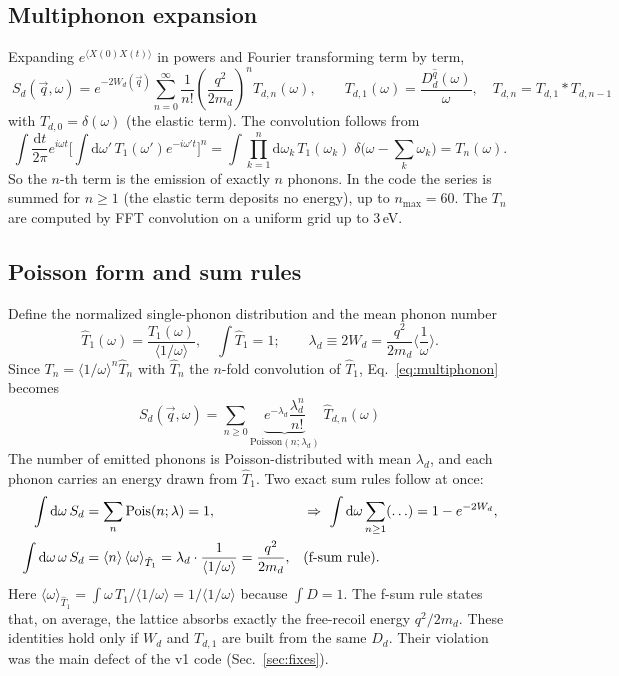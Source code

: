 \documentclass[11pt,a4paper]{article}
\numberwithin{equation}{section}
\newcommand{\qv}{\vec q}
\newcommand{\qh}{\hat q}
\newcommand{\dd}{\mathrm{d}}
\newcommand{\avg}[1]{\langle #1\rangle}
\begin{document}
\subsection{Multiphonon expansion}
Expanding $e^{\avg{X(0)X(t)}}$ in powers and Fourier transforming term by term,
\begin{equation}
  \boxed{\;S_d(\qv,\omega) = e^{-2W_d(\qv)}\sum_{n=0}^{\infty}\frac{1}{n!}
  \left(\frac{q^2}{2m_d}\right)^{\!n} T_{d,n}(\omega),\qquad
  T_{d,1}(\omega)=\frac{D_d^{\qh}(\omega)}{\omega},\quad
  T_{d,n}=T_{d,1}*T_{d,n-1}\;}
  \label{eq:multiphonon}
\end{equation}
with $T_{d,0}=\delta(\omega)$ (the elastic term). The convolution follows from
\begin{equation}
  \int\frac{\dd t}{2\pi}e^{i\omega t}\Big[\int\dd\omega'\,T_1(\omega')e^{-i\omega't}\Big]^n
  = \int\prod_{k=1}^n\dd\omega_k\,T_1(\omega_k)\;\delta\!\Big(\omega-\sum_k\omega_k\Big)
  = T_n(\omega).
\end{equation}
So the $n$-th term is the emission of exactly $n$ phonons. In the code the series is summed
for $n\ge1$ (the elastic term deposits no energy), up to $n_{\max}=60$. The $T_n$ are
computed by FFT convolution on a uniform grid up to 3\,eV.

\subsection{Poisson form and sum rules}
\label{sec:poisson}
Define the normalized single-phonon distribution and the mean phonon number
\begin{equation}
  \hat T_1(\omega)=\frac{T_1(\omega)}{\avg{1/\omega}},\quad\int\hat T_1=1;
  \qquad
  \lambda_d\equiv 2W_d=\frac{q^2}{2m_d}\avg{\frac1\omega}.
\end{equation}
Since $T_n=\avg{1/\omega}^n\hat T_n$ with $\hat T_n$ the $n$-fold convolution of $\hat T_1$,
Eq.~\eqref{eq:multiphonon} becomes
\begin{equation}
  \boxed{\;S_d(\qv,\omega)=\sum_{n\ge0}\underbrace{e^{-\lambda_d}\frac{\lambda_d^n}{n!}}
  _{\text{Poisson}(n;\lambda_d)}\;\hat T_{d,n}(\omega)\;}
  \label{eq:poisson}
\end{equation}
The number of emitted phonons is Poisson-distributed with mean $\lambda_d$, and each phonon
carries an energy drawn from $\hat T_1$. Two exact sum rules follow at once:
\begin{align}
  \int\dd\omega\,S_d &= \sum_n {\rm Pois}(n;\lambda)=1,
  &&\Rightarrow\ \int\dd\omega\sum_{n\ge1}(\ldots)=1-e^{-2W_d},
  \label{eq:sum0}\\
  \int\dd\omega\,\omega\,S_d &= \avg{n}\,\avg{\omega}_{\hat T_1}
  = \lambda_d\cdot\frac{1}{\avg{1/\omega}} = \frac{q^2}{2m_d},
  && \text{(f-sum rule)}.
  \label{eq:fsum}
\end{align}
Here $\avg{\omega}_{\hat T_1}=\int\omega\,T_1/\avg{1/\omega}=1/\avg{1/\omega}$ because
$\int D=1$. The f-sum rule states that, on average, the lattice absorbs exactly the
free-recoil energy $q^2/2m_d$. These identities hold only if $W_d$ and $T_{d,1}$ are built
from the same $D_d$. Their violation was the main defect of the v1 code
(Sec.~\ref{sec:fixes}).
\end{document}
